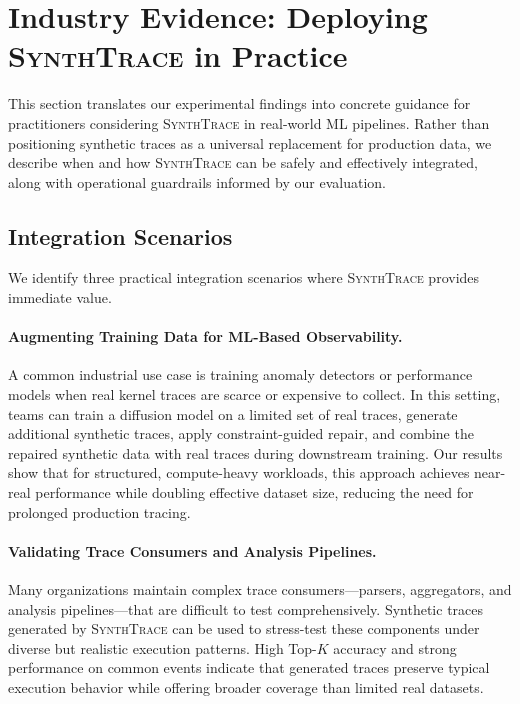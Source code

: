 \section{Industry Evidence: Deploying \textsc{SynthTrace} in Practice}

\label{sec:industry-evidence}

This section translates our experimental findings into concrete guidance for practitioners considering \textsc{SynthTrace} in real-world ML pipelines. Rather than positioning synthetic traces as a universal replacement for production data, we describe when and how \textsc{SynthTrace} can be safely and effectively integrated, along with operational guardrails informed by our evaluation.

\subsection{Integration Scenarios}

We identify three practical integration scenarios where \textsc{SynthTrace} provides immediate value.

\paragraph{Augmenting Training Data for ML-Based Observability.}
A common industrial use case is training anomaly detectors or performance models when real kernel traces are scarce or expensive to collect. In this setting, teams can train a diffusion model on a limited set of real traces, generate additional synthetic traces, apply constraint-guided repair, and combine the repaired synthetic data with real traces during downstream training. Our results show that for structured, compute-heavy workloads, this approach achieves near-real performance while doubling effective dataset size, reducing the need for prolonged production tracing.

\paragraph{Validating Trace Consumers and Analysis Pipelines.}
Many organizations maintain complex trace consumers—parsers, aggregators, and analysis pipelines—that are difficult to test comprehensively. Synthetic traces generated by \textsc{SynthTrace} can be used to stress-test these components under diverse but realistic execution patterns. High Top-$K$ accuracy and strong performance on common events indicate that generated traces preserve typical execution behavior while offering broader coverage than limited real datasets.

